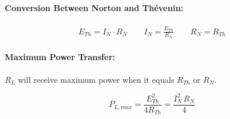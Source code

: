 	\paragraph{Conversion Between Norton and Thévenin:} %
		\begin{gather*}
			E_{Th} = I_N \cdot R_N \qquad
			I_N = \frac{E_{Th}}{R_N} \qquad R_N = R_{Th}
		\end{gather*}
	
	\paragraph{Maximum Power Transfer:} %
		$R_L$ will receive maximum power when it equals $R_{Th}$ or $R_N$.

		\[
			P_{L,max} = \frac{E_{Th}^2}{4 R_{Th}} = \frac{I_N^2 \, R_N}{4}
		\]
	
